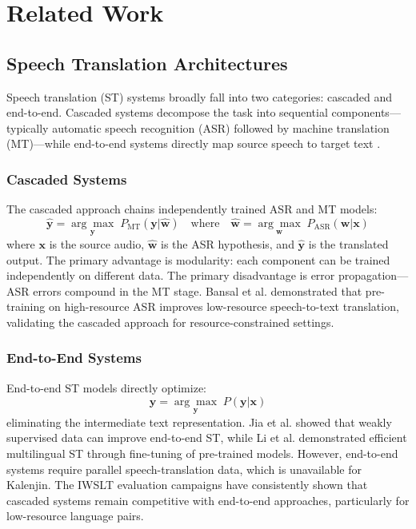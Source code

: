 \documentclass[conference]{IEEEtran}
\begin{document}
\section{Related Work}

\subsection{Speech Translation Architectures}

Speech translation (ST) systems broadly fall into two categories: cascaded and end-to-end. Cascaded systems decompose the task into sequential components---typically automatic speech recognition (ASR) followed by machine translation (MT)---while end-to-end systems directly map source speech to target text \cite{sperber2020speech}.

\subsubsection{Cascaded Systems}
The cascaded approach chains independently trained ASR and MT models:
\begin{equation}
\hat{\mathbf{y}} = \underset{\mathbf{y}}{\arg\max}\; P_{\text{MT}}(\mathbf{y} | \hat{\mathbf{w}}) \quad \text{where} \quad \hat{\mathbf{w}} = \underset{\mathbf{w}}{\arg\max}\; P_{\text{ASR}}(\mathbf{w} | \mathbf{x})
\label{eq:cascaded}
\end{equation}
where $\mathbf{x}$ is the source audio, $\hat{\mathbf{w}}$ is the ASR hypothesis, and $\hat{\mathbf{y}}$ is the translated output. The primary advantage is modularity: each component can be trained independently on different data. The primary disadvantage is error propagation---ASR errors compound in the MT stage. Bansal et al. \cite{bansal2019pre} demonstrated that pre-training on high-resource ASR improves low-resource speech-to-text translation, validating the cascaded approach for resource-constrained settings.

\subsubsection{End-to-End Systems}
End-to-end ST models directly optimize:
\begin{equation}
\hat{\mathbf{y}} = \underset{\mathbf{y}}{\arg\max}\; P(\mathbf{y} | \mathbf{x})
\label{eq:e2e}
\end{equation}
eliminating the intermediate text representation. Jia et al. \cite{jia2019leveraging} showed that weakly supervised data can improve end-to-end ST, while Li et al. \cite{li2021multilingual} demonstrated efficient multilingual ST through fine-tuning of pre-trained models. However, end-to-end systems require parallel speech-translation data, which is unavailable for Kalenjin. The IWSLT evaluation campaigns \cite{anastasopoulos2022findings} have consistently shown that cascaded systems remain competitive with end-to-end approaches, particularly for low-resource language pairs.
\end{document}
